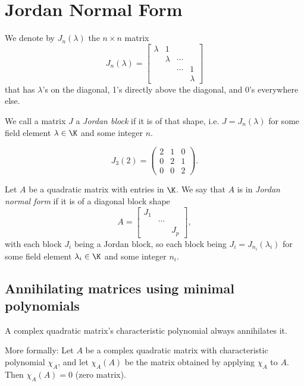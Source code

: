 \section{Jordan Normal Form}
\begin{definition}
    We denote by $J_n(\lambda)$ the $n \times n$ matrix
    $$J_n(\lambda)= \begin{bmatrix} \lambda & 1 \\ & \lambda & \cdots \\ & & \cdots & 1 \\ & & & \lambda \end{bmatrix}$$
    that has $\lambda$'s on the diagonal, 1's directly above the diagonal, and 0's everywhere else.

    We call a matrix $J$ a \emph{Jordan block} if it is of that shape, i.e. $J=J_n(\lambda)$ for some field element
    $\lambda \in \K$ and some integer $n$.
\end{definition}
\begin{example}
    $$J_3(2) = \begin{pmatrix}2&1&0\\0&2&1\\0&0&2\end{pmatrix}.$$
\end{example}


\begin{definition}
    Let $A$ be a quadratic matrix with entries in $\K$. We say that $A$ is in \emph{Jordan normal form} if it is of a
    diagonal block shape
    $$A = \begin{bmatrix}J_1\\&\cdots\\&&J_p\end{bmatrix},$$
    with each block $J_i$ being a Jordan block, so each block being $J_i = J_{n_i}(\lambda_i)$ for some field element
    $\lambda_i \in \K$ and some integer $n_i$.
\end{definition}

\subsection{Annihilating matrices using minimal polynomials}
\begin{theorem}[Cayley-Hamilton theorem for $\K = \C$]
    A complex quadratic matrix's characteristic polynomial always annihilates it.

    More formally: Let $A$ be a complex quadratic matrix with characteristic polynomial $\chi_A$, and let $\chi_A(A)$
    be the matrix obtained by applying $\chi_A$ to $A$. Then $\chi_A(A) = 0$ (zero matrix).
\end{theorem}

